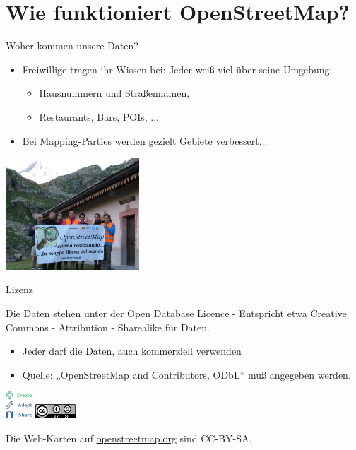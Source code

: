\documentclass{beamer}
\begin{document}
\section{Wie funktioniert OpenStreetMap?}

\begin{frame}{Woher kommen unsere Daten?}

\begin{itemize}
  \item Freiwillige tragen ihr Wissen bei: Jeder weiß viel über seine Umgebung:
	\begin{itemize}
	  \item Hausnummern und Straßennamen,
	  \item Restaurants, Bars, POIs, ...
  \end{itemize}
  \pause
  \item Bei Mapping-Parties werden gezielt Gebiete verbessert...
\end{itemize}

 \begin{center}
 \includegraphics[width=5cm]{alps_mp.jpg}
 \end{center}

\end{frame}

\begin{frame}{Lizenz}

Die Daten stehen unter der Open Database Licence - Entspricht etwa Creative Commons - Attribution - Sharealike für Daten.
\begin{itemize}
  \item Jeder darf die Daten, auch kommerziell verwenden
  \item Quelle: „OpenStreetMap and Contributors, ODbL“ muß angegeben werden.
\end{itemize}

 \begin{center}
 \includegraphics[width=1cm]{ODbL.png}
 \hspace{2cm}
 \includegraphics[width=1.5cm]{cc-by-sa.png}
 \end{center}

\pause
Die Web-Karten auf \href{http://osm.org}{openstreetmap.org} sind CC-BY-SA.

\end{frame}
\end{document}
